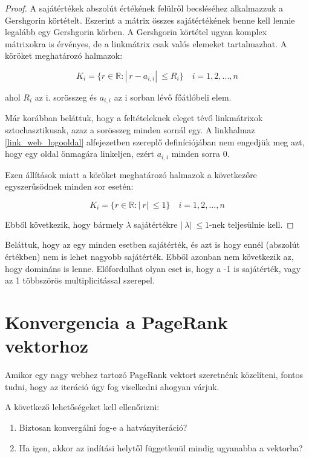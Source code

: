 \documentclass[12pt,a4paper]{article}
\begin{document}
\begin{proof}
	A sajátértékek abszolút értékének felülről becsléséhez alkalmazzuk a Gershgorin körtételt. Eszerint a mátrix összes sajátértékének benne kell lennie legalább egy Gershgorin körben. A Gershgorin körtétel ugyan komplex mátrixokra is érvényes, de a linkmátrix csak valós elemeket tartalmazhat. A köröket meghatározó halmazok: 
	
	\[ K_i = \{ r \in \mathbb{R}: |\ r - a_{i,i} |\ \leq R_i \} \quad i = 1,2,...,n \]
	
	ahol $R_i$ az i. sorösszeg és $a_{i,i}$ az i sorban lévő főátlóbeli elem.
	
	Már korábban beláttuk, hogy a feltételeknek eleget tévő linkmátrixok sztochasztikusak, azaz a sorösszeg minden sornál egy. A linkhalmaz \ref{link_web_logooldal} alfejezetben szereplő definíciójában nem engedjük meg azt, hogy egy oldal önmagára linkeljen, ezért $a_{i,i}$ minden sorra 0.
	
	Ezen állítások miatt a köröket meghatározó halmazok a következőre egyszerűsödnek minden sor esetén:
	
	\[ K_i = \{ r \in \mathbb{R}: |\ r |\ \leq 1 \} \quad i = 1,2,...,n \]
	
	Ebből következik, hogy bármely $\lambda$ sajátértékre $ |\ \lambda |\ \leq 1$-nek teljesülnie kell.
\end{proof}

Beláttuk, hogy az egy minden esetben sajátérték, és azt is hogy ennél (abszolút értékben) nem is lehet nagyobb sajátérték. Ebből azonban nem következik az, hogy domináns is lenne. Előfordulhat olyan eset is, hogy a -1 is sajátérték, vagy az 1 többszörös multiplicitással szerepel.

\section{Konvergencia a PageRank vektorhoz}

Amikor egy nagy webhez tartozó PageRank vektort szeretnénk közelíteni, fontos tudni, hogy az iteráció úgy fog viselkedni ahogyan várjuk.

\vspace{0.3cm}
A következő lehetőségeket kell ellenőrizni:

\begin{enumerate}
	\item Biztosan konvergálni fog-e a hatványiteráció?
	\item Ha igen, akkor az indítási helytől függetlenül mindig ugyanabba a vektorba? 
\end{enumerate}
\end{document}
